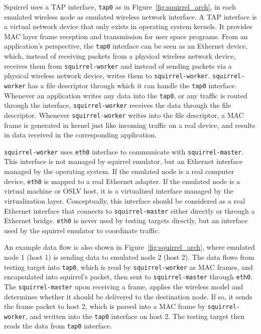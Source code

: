 \documentclass[12pt]{report}
\begin{document}
Squirrel uses a TAP\cite{tuntap} interface, \texttt{tap0} as in Figure~\ref{fig:squirrel_arch}, in each emulated wireless node as emulated wireless network interface. A TAP interface is a virtual network device that only exists in operating system kernels. It provides MAC layer frame reception and transmission for user space programs. From an application's perspective, the \texttt{tap0} interface can be seen as an Ethernet device, which, instead of receiving packets from a physical wireless network device, receives them from \texttt{squirrel-worker} and instead of sending packets via a physical wireless network device, writes them to \texttt{squirrel-worker}. \texttt{squirrel-worker} has a file descriptor through which it can handle the \texttt{tap0} interface. Whenever an application writes any data into the \texttt{tap0}, or any traffic is routed through the interface, \texttt{squirrel-worker} receives the data through the file descriptor. Whenever \texttt{squirrel-worker} writes into the file descriptor, a MAC frame is generated in kernel just like incoming traffic on a real device, and results in data received in the corresponding application.

\texttt{squirrel-worker} uses \texttt{eth0} interface to communicate with \texttt{squirrel-master}. This interface is not managed by squirrel emulator, but an Ethernet interface managed by the operating system. If the emulated node is a real computer device, \texttt{eth0} is mapped to a real Ethernet adapter. If the emulated node is a virtual machine or OSLV host, it is a virtualized interface managed by the virtualization layer. Conceptually, this interface should be considered as a real Ethernet interface that connects to \texttt{squirrel-master} either directly or through a Ethernet bridge. \texttt{eth0} is never used by testing targets directly, but an interface used by the squirrel emulator to coordinate traffic.

An example data flow is also shown in Figure~\ref{fig:squirrel_arch}, where emulated node 1 (host 1) is sending data to emulated node 2 (host 2). The data flows from testing target into \texttt{tap0}, which is read by \texttt{squirrel-worker} as MAC frames, and encapsulated into squirrel's packet, then sent to \texttt{squirrel-master} through \texttt{eth0}. The \texttt{squirrel-master} upon receiving a frame, applies the wireless model and determines whether it should be delivered to the destination node. If so, it sends the frame packet to host 2, which is parsed into a MAC frame by \texttt{squirrel-worker}, and written into the \texttt{tap0} interface on host 2. The testing target then reads the data from \texttt{tap0} interface.
\end{document}

